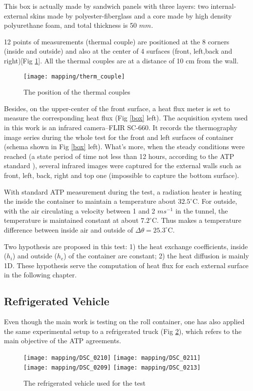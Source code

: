 This box is actually made by sandwich panels with three layers: two internal-external skins made by polyester-fiberglass and a core made by high density polyurethane foam, and total thickness is 50 $mm$. \label{box_detail}

12 points of measurements (thermal couple) are positioned at the 8 corners (inside and outside) and also at the center of 4 surfaces (front, left,back and right)[Fig \ref{therm_couple}]. All the thermal couples are at a distance of 10 cm from the wall.
\begin{figure}[!htbp]
	\centering
	\texttt{[image: mapping/therm\_couple]}
	\caption{The position of the thermal couples}
	\label{therm_couple}
\end{figure}
Besides, on the upper-center of the front surface, a heat flux meter is set to measure the corresponding heat flux (Fig \ref{box} left). The acquisition system used in this work is an infrared camera--FLIR SC-660. It records the thermography image series during the whole test for the front and left surfaces of container (schema shown in Fig \ref{box} left). What's more, when the steady conditions were reached (a state period of time not less than 12 hours, according to the ATP standard \citep{rossi2009k}), several infrared images were captured for the external walls such as front, left, back, right and top one (impossible to capture the bottom surface). 

With standard ATP measurement during the test, a radiation heater is heating the inside the container to maintain a temperature about $32.5^{\circ}$C. For outside, with the air circulating a velocity between 1 and 2 $m s^{-1}$ in the tunnel, the temperature is maintained constant at about $7.2^{\circ}$C. Thus makes a temperature difference between inside air and outside of $\Delta \theta = 25.3^{\circ}$C.

Two hypothesis are proposed in this test: 1) the  heat exchange coefficients, inside ($h_i$) and outside ($h_e$) of the container are constant;\label{hyp1} 2) the heat diffusion is mainly 1D. These hypothesis serve the computation of heat flux for each external surface in the following chapter.

\subsection{Refrigerated Vehicle}

Even though the main work is testing on the roll container, one has also applied the same experimental setup to a refrigerated truck (Fig \ref{truck}), which refers to the main objective of the ATP agreements.
\begin{figure}[!htbp]
	\hspace{-10mm}
	\texttt{[image: mapping/DSC\_0210]}
	\texttt{[image: mapping/DSC\_0211]}\\
	
	\texttt{[image: mapping/DSC\_0209]}
	\texttt{[image: mapping/DSC\_0213]}
	\caption{The refrigerated vehicle used for the test}
	\label{truck}
\end{figure}


